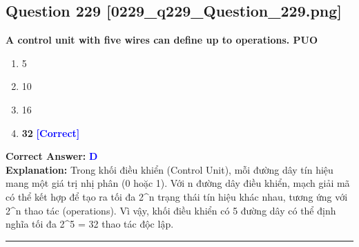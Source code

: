 \documentclass[11pt,a4paper]{article}
\begin{document}
\begin{minipage}{\textwidth}
\subsection*{Question 229 \quad \footnotesize{[0229\_q229\_Question\_229.png]}}
\noindent \textbf{A control unit with five wires can define up to operations. PUO}

\begin{enumerate}[label=\Alph*.]
    \item 5
    \item 10
    \item 16
    \item \textbf{32} \hfill \textcolor{blue}{\textbf{[Correct]}}
\end{enumerate}

\noindent \textbf{Correct Answer:} \textcolor{blue}{\textbf{D}} \\[2pt]
\noindent \textbf{Explanation:} Trong khối điều khiển (Control Unit), mỗi đường dây tín hiệu mang một giá trị nhị phân (0 hoặc 1). Với n đường dây điều khiển, mạch giải mã có thể kết hợp để tạo ra tối đa 2\textasciicircum{}n trạng thái tín hiệu khác nhau, tương ứng với 2\textasciicircum{}n thao tác (operations). Vì vậy, khối điều khiển có 5 đường dây có thể định nghĩa tối đa 2\textasciicircum{}5 = 32 thao tác độc lập.

\par\vspace{0.3cm}
\hrule
\vspace{0.3cm}
\end{minipage}
\end{document}
